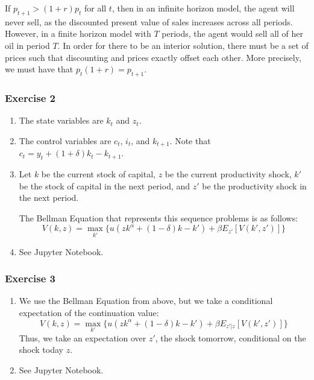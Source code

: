 \documentclass[letterpaper,12pt]{article}
\theoremstyle{definition}
\begin{document}
\begin{enumerate}
  If $p_{t+1} > (1+r) p_t$ for all $t$, then in an infinite horizon model, the agent will never sell, as the discounted present value of sales increases across all periods. However, in a finite horizon model with $T$ periods, the agent would sell all of her oil in period $T$. In order for there to be an interior solution, there must be a set of prices such that discounting and prices exactly offset each other. More precisely, we must have that $p_t (1 + r) = p_{t+1}$.
\end{enumerate}

\subsubsection*{Exercise 2}
\begin{enumerate}
  \item The state variables are $k_t$ and $z_t$.
  \item The control variables are $c_t$, $i_t$, and $k_{t+1}$. Note that $c_t = y_t + (1+\delta)k_t - k_{t+1}$.
  \item Let $k$ be the current stock of capital, $z$ be the current productivity shock, $k'$ be the stock of capital in the next period, and $z'$ be the productivity shock in the next period.

  The Bellman Equation that represents this sequence problems is as follows:
  \begin{equation}
    V(k,z) = \max_{k'} \{ u(zk^{\alpha} + (1-\delta)k - k') + \beta E_{z'}[V(k',z')] \} \tag{for all $k$ and $z$}
  \end{equation}
  \item See Jupyter Notebook.
\end{enumerate}

\subsubsection*{Exercise 3}
\begin{enumerate}
  \item We use the Bellman Equation from above, but we take a conditional expectation of the continuation value:
  \begin{equation}
    V(k,z) = \max_{k'} \{ u(zk^{\alpha} + (1-\delta)k - k') + \beta E_{z'|z}[V(k',z')] \} \tag{for all $k$}
  \end{equation}
  Thus, we take an expectation over $z'$, the shock tomorrow, conditional on the shock today $z$.
  \item See Jupyter Notebook.
\end{enumerate}
\end{document}
